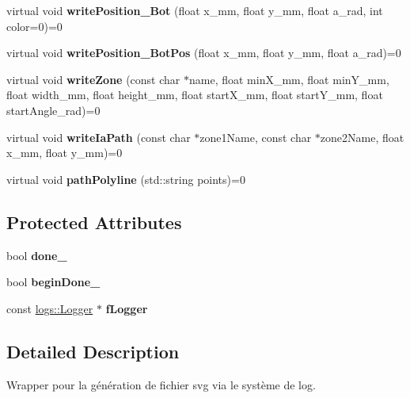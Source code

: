 \begin{DoxyCompactItemize}
\mbox{\label{classSvgWriter_a1b9df8d232ad40c0818be21ee057cad0}} 
virtual void {\bfseries write\+Position\+\_\+\+Bot} (float x\+\_\+mm, float y\+\_\+mm, float a\+\_\+rad, int color=0)=0
\item 
\mbox{\label{classSvgWriter_af8e2a0679e17a9b8df363450fc7ca598}} 
virtual void {\bfseries write\+Position\+\_\+\+Bot\+Pos} (float x\+\_\+mm, float y\+\_\+mm, float a\+\_\+rad)=0
\item 
\mbox{\label{classSvgWriter_ac1a7e8a8541391a22424b4e6c6efa6c8}} 
virtual void {\bfseries write\+Zone} (const char $\ast$name, float min\+X\+\_\+mm, float min\+Y\+\_\+mm, float width\+\_\+mm, float height\+\_\+mm, float start\+X\+\_\+mm, float start\+Y\+\_\+mm, float start\+Angle\+\_\+rad)=0
\item 
\mbox{\label{classSvgWriter_a9f3b5c557a70c8ef2daee65ef61e8456}} 
virtual void {\bfseries write\+Ia\+Path} (const char $\ast$zone1\+Name, const char $\ast$zone2\+Name, float x\+\_\+mm, float y\+\_\+mm)=0
\item 
\mbox{\label{classSvgWriter_a7079faf0c694ff10efe2f7e178d9e97c}} 
virtual void {\bfseries path\+Polyline} (std\+::string points)=0
\end{DoxyCompactItemize}
\subsection*{Protected Attributes}
\begin{DoxyCompactItemize}
\item 
\mbox{\label{classSvgWriter_a13da502348d120472ef4b6032a98dd8a}} 
bool {\bfseries done\+\_\+}
\item 
\mbox{\label{classSvgWriter_a628e2263568c0486b340c77684982c54}} 
bool {\bfseries begin\+Done\+\_\+}
\item 
\mbox{\label{classSvgWriter_a8b23484c91d2b42d081a1ff21c4e45e6}} 
const \hyperlink{classlogs_1_1Logger}{logs\+::\+Logger} $\ast$ {\bfseries f\+Logger}
\end{DoxyCompactItemize}


\subsection{Detailed Description}
Wrapper pour la génération de fichier svg via le système de log. 

